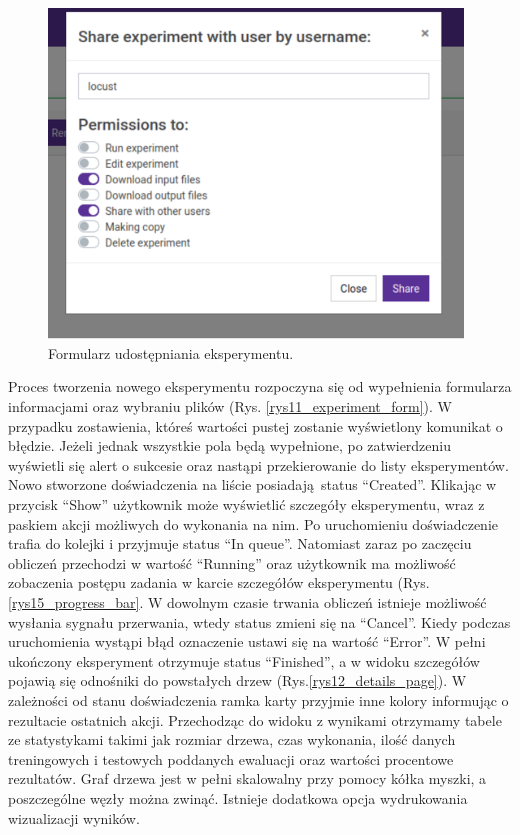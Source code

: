 \begin{figure}[htb]
	\centering
	\includegraphics[width=11cm]{grafika/share_form.eps}
	\caption{Formularz udostępniania eksperymentu.}
	\label{rys14_share_form}
\end{figure}


Proces tworzenia nowego eksperymentu rozpoczyna się od wypełnienia formularza informacjami oraz wybraniu plików (Rys. \ref{rys11_experiment_form}). W przypadku zostawienia, któreś wartości pustej zostanie wyświetlony komunikat o błędzie. Jeżeli jednak wszystkie pola będą wypełnione, po zatwierdzeniu wyświetli się alert o sukcesie oraz nastąpi przekierowanie do listy eksperymentów. Nowo stworzone doświadczenia na liście posiadają status \enquote{Created}. Klikając w przycisk \enquote{Show} użytkownik może wyświetlić szczegóły eksperymentu, wraz z paskiem akcji możliwych do wykonania na nim. Po uruchomieniu doświadczenie trafia do kolejki i przyjmuje status \enquote{In queue}. Natomiast zaraz po zaczęciu obliczeń przechodzi w wartość \enquote{Running} oraz użytkownik ma możliwość zobaczenia postępu zadania w karcie szczegółów eksperymentu (Rys. \ref{rys15_progress_bar}. W dowolnym czasie trwania obliczeń istnieje możliwość wysłania sygnału przerwania, wtedy status zmieni się na \enquote{Cancel}. Kiedy podczas uruchomienia wystąpi błąd oznaczenie ustawi się na wartość \enquote{Error}. W pełni ukończony eksperyment otrzymuje status \enquote{Finished}, a w widoku szczegółów pojawią się odnośniki do powstałych drzew (Rys.\ref{rys12_details_page}). W zależności od stanu doświadczenia ramka karty przyjmie inne kolory informując o rezultacie ostatnich akcji. Przechodząc do widoku z wynikami otrzymamy tabele ze statystykami takimi jak rozmiar drzewa, czas wykonania, ilość danych treningowych i testowych poddanych ewaluacji oraz wartości procentowe rezultatów. Graf drzewa jest w pełni skalowalny przy pomocy kółka myszki, a poszczególne węzły można zwinąć. Istnieje dodatkowa opcja wydrukowania wizualizacji wyników.




